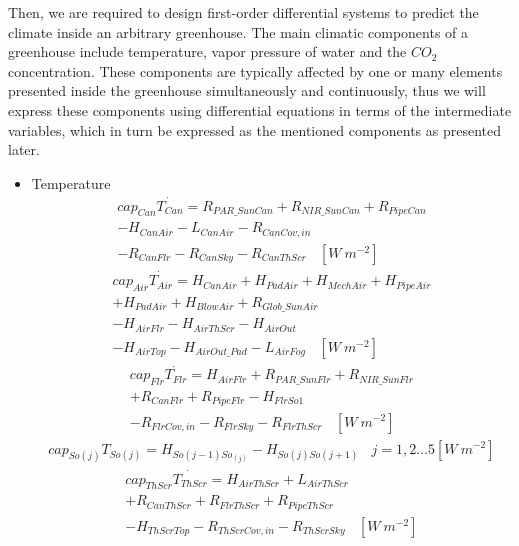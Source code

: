 \documentclass[a4paper]{article}
\numberwithin{equation}{section}
\begin{document}
Then, we are required to design first-order differential systems to predict the climate inside an arbitrary greenhouse.
The main climatic components of a greenhouse include temperature, vapor pressure of water and the \(CO_2\) concentration.
These components are typically affected by one or many elements presented inside the greenhouse simultaneously and continuously, thus we will express these components using differential equations in terms of the intermediate variables, which in turn be expressed as the mentioned components as presented later.
\begin{itemize}
  \item Temperature
        \begin{multline*}
          cap_{Can}\dot{T_{Can}} = {}R_{PAR\_SunCan} + R_{NIR\_SunCan} + R_{PipeCan} \\
          - H_{CanAir} - L_{CanAir} - R_{CanCov,in} \\
          - R_{CanFlr} - R_{CanSky} - R_{CanThScr} ~~~~ [W\ m^{-2}]
        \end{multline*}
        \begin{multline*}
          cap_{Air}\dot{T_{Air}} = H_{CanAir} + H_{PadAir} + H_{MechAir} + H_{PipeAir} \\
          + H_{PadAir} + H_{BlowAir} + R_{Glob\_SunAir} \\
          - H_{AirFlr} - H_{AirThScr} - H_{AirOut} \\
          - H_{AirTop} - H_{AirOut\_Pad} - L_{AirFog} ~~~~ [W\ m^{-2}]
        \end{multline*}
        \begin{multline*}
          cap_{Flr}\dot{T_{Flr}} = H_{AirFlr} + R_{PAR\_SunFlr} + R_{NIR\_SunFlr} \\
          + R_{CanFlr} + R_{PipeFlr} - H_{FlrSo1} \\
          - R_{FlrCov,in} - R_{FlrSky} - R_{FlrThScr} ~~~~ [W\ m^{-2}]
        \end{multline*}
        \begin{multline*}
          cap_{So(j)}T_{So(j)} = H_{So(j-1)So_{(j)}} - H_{So(j)So(j+1)} ~~~~ j=1,2\dots5 [W\ m^{-2}]
        \end{multline*}
        \begin{multline*}
          cap_{ThScr}\dot{T_{ThScr}} = H_{AirThScr} + L_{AirThScr} \\
          + R_{CanThScr} + R_{FlrThScr} + R_{PipeThScr} \\
          - H_{ThScrTop} - R_{ThScrCov,in} - R_{ThScrSky} ~~~~ [W\ m^{-2}]

\end{multline*}
\end{itemize}
\end{document}
